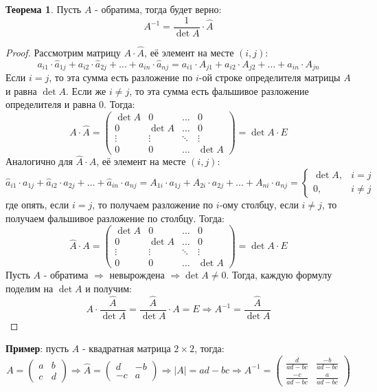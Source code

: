 \documentclass[12pt]{article}
\theoremstyle{definition}
\newtheorem{theorem}{Теорема}
\newcommand{\wht}[1]{\widehat{#1}}
\begin{document}
\begin{theorem}
	Пусть $A$ - обратима, тогда будет верно:
	$$
		A^{-1} = \dfrac{1}{\det{A}}{\cdot}\wht{A}
	$$
\end{theorem}
\begin{proof}
	Рассмотрим матрицу $A{\cdot}\wht{A}$, её элемент на месте $(i,j)$:
	$$
		a_{i1}{\cdot}\wht{a}_{1j} + a_{i2}{\cdot}\wht{a}_{2j} + \dotsc + a_{in}{\cdot}\wht{a}_{nj} = a_{i1}{\cdot}A_{j1} + a_{i2}{\cdot}A_{j2} + \dotsc + a_{in}{\cdot}A_{jn} 
	$$
	Если $i = j$, то эта сумма есть разложение по $i$-ой строке определителя матрицы $A$ и равна $\det{A}$. Если же $i \neq j$, то эта сумма есть фальшивое разложение определителя и равна $0$. Тогда:
	$$
		A{\cdot}\wht{A} = 
		\begin{pmatrix}
			\det{A} & 0 & \dotsc & 0\\
			0 & \det{A} & \dotsc & 0\\
			\vdots & \vdots & \ddots & \vdots \\
			0 & 0 & \dotsc & \det{A}
		\end{pmatrix} = \det{A}{\cdot}E
	$$
	Аналогично для $\wht{A}{\cdot}A$, её элемент на месте $(i,j)$:
	$$
		\wht{a}_{i1}{\cdot}a_{1j} + \wht{a}_{i2}{\cdot}a_{2j} + \dotsc + \wht{a}_{in}{\cdot}a_{nj} = A_{1i}{\cdot}a_{1j} + A_{2i}{\cdot}a_{2j} + \dotsc + A_{ni}{\cdot}a_{nj} = 
		\left\{
			\begin{array}{rl}
				\det{A}, & i = j\\
				0, & i \neq j
			\end{array}
		\right.
	$$
	где опять, если $i=j$, то получаем разложение по $i$-ому столбцу, если $i\neq j$, то получаем фальшивое разложение по столбцу. Тогда:
	$$
		\wht{A}{\cdot}A = 		
		\begin{pmatrix}
			\det{A} & 0 & \dotsc & 0\\
			0 & \det{A} & \dotsc & 0\\
			\vdots & \vdots & \ddots & \vdots \\
			0 & 0 & \dotsc & \det{A}
		\end{pmatrix} = \det{A}{\cdot}E
	$$
	Пусть $A$ - обратима $\Rightarrow$ невырождена $\Rightarrow \det{A} \neq 0$. Тогда, каждую формулу поделим на $\det{A}$ и получим:
	$$
		A{\cdot}\dfrac{\wht{A}}{\det{A}} = \dfrac{\wht{A}}{\det{A}}{\cdot}A = E \Rightarrow A^{-1} = \dfrac{\wht{A}}{\det{A}}
	$$
\end{proof}

\textbf{Пример}: пусть $A$ - квадратная матрица $2 \times 2$, тогда:
$$
	A = \begin{pmatrix}
			a & b \\
			c & d
		\end{pmatrix} \Rightarrow 
		\wht{A} = 
		\begin{pmatrix}
			d & -b \\
			-c & a
		\end{pmatrix} \Rightarrow |A| = ad - bc \Rightarrow A^{-1} = 
		\begin{pmatrix}
			\tfrac{d}{ad - bc} & \tfrac{-b}{ad - bc}\\
			\tfrac{-c}{ad - bc} & \tfrac{a}{ad - bc}
		\end{pmatrix}
$$
\end{document}
